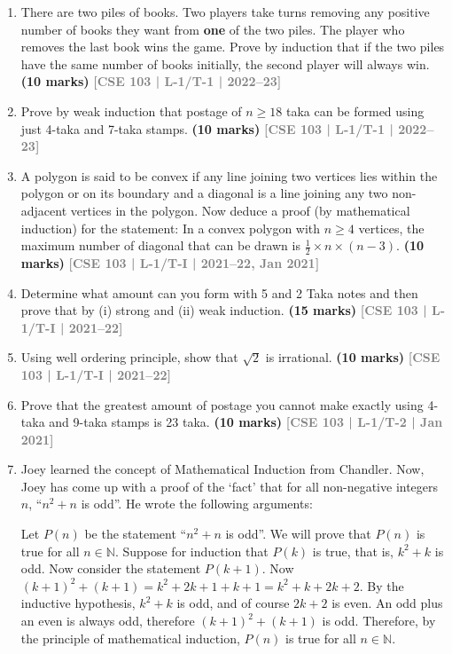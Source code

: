 \documentclass[12pt,a3paper]{article}
\newcommand{\yr}[1]{\hfill\textcolor{gray}{\small\textbf{[#1]}}}
\newcommand{\mk}[1]{\textcolor{orange!70!black}{\small\textbf{(#1 marks)}}}
\begin{document}
\begin{enumerate}
\item There are two piles of books. Two players take turns removing any positive number of books they want from \textbf{one} of the two piles. The player who removes the last book wins the game. Prove by induction that if the two piles have the same number of books initially, the second player will always win.
\mk{10} \yr{CSE 103 | L-1/T-1 | 2022--23}

\item Prove by weak induction that postage of $n \geq 18$ taka can be formed using just 4-taka and 7-taka stamps.
\mk{10} \yr{CSE 103 | L-1/T-1 | 2022--23}

\item A polygon is said to be convex if any line joining two vertices lies within the polygon or on its boundary and a diagonal is a line joining any two non-adjacent vertices in the polygon. Now deduce a proof (by mathematical induction) for the statement: In a convex polygon with $n \ge 4$ vertices, the maximum number of diagonal that can be drawn is $\frac{1}{2} \times n \times (n - 3)$.
\mk{10} \yr{CSE 103 | L-1/T-I | 2021--22, Jan 2021}

\item Determine what amount can you form with 5 and 2 Taka notes and then prove that by (i) strong and (ii) weak induction.
\mk{15} \yr{CSE 103 | L-1/T-I | 2021--22}

\item Using well ordering principle, show that $\sqrt{2}$ is irrational.
\mk{10} \yr{CSE 103 | L-1/T-I | 2021--22}


\item Prove that the greatest amount of postage you cannot make exactly using 4-taka and 9-taka stamps is 23 taka.
\mk{10} \yr{CSE 103 | L-1/T-2 | Jan 2021}

\item Joey learned the concept of Mathematical Induction from Chandler. Now, Joey has come up with a proof of the `fact' that for all non-negative integers $n$, ``$n^2 + n$ is odd''. He wrote the following arguments:

\begin{tcolorbox}[colback=gray!5,colframe=gray!40,boxrule=0.5pt,arc=4pt,
  left=8pt,right=8pt,top=6pt,bottom=6pt]
\small Let $P(n)$ be the statement ``$n^2 + n$ is odd''. We will prove that $P(n)$ is true for all $n \in \mathbb{N}$. Suppose for induction that $P(k)$ is true, that is, $k^2 + k$ is odd. Now consider the statement $P(k+1)$. Now $(k+1)^2 + (k+1) = k^2 + 2k + 1 + k + 1 = k^2 + k + 2k + 2$. By the inductive hypothesis, $k^2 + k$ is odd, and of course $2k + 2$ is even. An odd plus an even is always odd, therefore $(k+1)^2 + (k+1)$ is odd. Therefore, by the principle of mathematical induction, $P(n)$ is true for all $n \in \mathbb{N}$.
\end{tcolorbox}


\end{enumerate}
\end{document}
